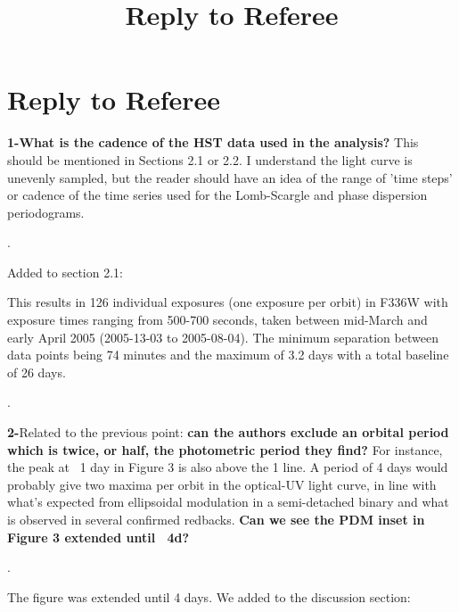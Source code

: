 \documentclass{article}
\title{Reply to Referee}
\begin{document}
\maketitle

\section*{Reply to Referee}


\textbf{1-What is the cadence of the HST data used in the analysis?} This
 should be mentioned in Sections 2.1 or 2.2. I understand the light
 curve is unevenly sampled, but the reader should have an idea of the
 range of 'time steps' or cadence of the time series used for the
 Lomb-Scargle and phase dispersion periodograms.
 
 
\hrulefill. 


 Added to section 2.1:
 
\begin{displayquote}
This results in 126 individual exposures (one exposure per orbit) in F336W with exposure times ranging from 500-700 seconds, taken between mid-March and early April 2005 (2005-13-03 to 2005-08-04). The minimum separation between data points being 74 minutes and the maximum of 3.2 days with a total baseline of 26 days.
\end{displayquote}
 
 

 \hrulefill. 

\textbf{2-}Related to the previous point: \textbf{can the authors exclude an orbital period which is twice, or half, the photometric period they find?} 
For
 instance, the peak at ~1 day in Figure 3 is also above the 1%
 line. A period of 4 days would probably give two maxima per orbit in
 the optical-UV light curve, in line with what's expected from
 ellipsoidal modulation in a semi-detached binary and what is observed
 in several confirmed redbacks. \textbf{Can we see the PDM inset in Figure 3
 extended until ~4d?}

 \hrulefill. 



 The figure was extended until 4 days. We added to the discussion section:
 
\end{document}
